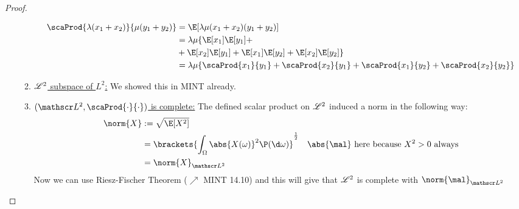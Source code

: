 \begin{proof}
\begin{enumerate}
\begin{enumerate}
			\begin{align*}
				\scaProd{\lambda(x_1+x_2)}{\mu(y_1+y_2)} &= \E[\lambda\mu(x_1+x_2)(y_1+y_2)]\\
				&= \lambda\mu \{ \E[x_1]\E[y_1] + \\&+\E[x_2]\E[y_1] + \E[x_1]\E[y_2] + \E[x_2]\E[y_2]\}\\
				&= \lambda \mu \{ \scaProd{x_1}{y_1} + \scaProd{x_2}{y_1} + \scaProd{x_1}{y_2} + \scaProd{x_2}{y_2}\}
			\end{align*}
			\item \ul{$\mathscr{L}^{2}$ subspace of $L^2$:} We showed this in MINT already.
			\item \ul{$(\Ln{2}, \scaProd{\cdot}{\cdot})$ is complete:} The defined scalar product on $\mathscr{L}^{2}$ induced a norm in the following way:
			\begin{align*}
				\norm{X} &:= \sqrt{\E[X^2]}\\
				&=\brackets{ \int_{\O} \abs{X(\omega)}^2 \P(\d \omega)}^{\frac{1}{2}} \quad\abs{\mal}\text{ here because } X^2 >0 \text{ always}\\
				&= \norm{X}_{\Ln{2}}
			\end{align*}
			Now we can use Riesz-Fischer Theorem ($\nearrow$ MINT 14.10) and this will give that $\mathscr{L}^{2}$ is complete with $\norm{\mal}_{\Ln{2}}$
		\end{enumerate}
	\end{enumerate}
\end{proof}